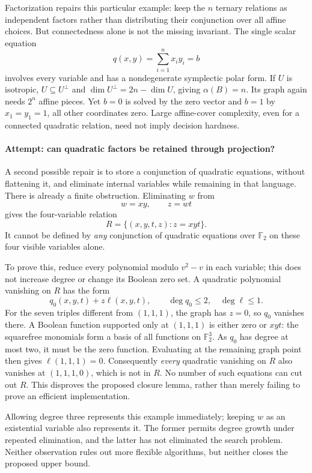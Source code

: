 \documentclass[11pt]{article}
\newcommand{\F}{\mathbb{F}}
\begin{document}
Factorization repairs this particular example: keep the $n$ ternary relations
as independent factors rather than distributing their conjunction over all
affine choices. But connectedness alone is not the missing invariant. The
single scalar equation
\[
                  q(x,y)=\sum_{i=1}^n x_i y_i=b
\]
involves every variable and has a nondegenerate symplectic polar form. If $U$
is isotropic, $U\subseteq U^\perp$ and $\dim U^\perp=2n-\dim U$, giving
$\alpha(B)=n$. Its graph again needs $2^n$ affine pieces. Yet $b=0$ is solved
by the zero vector and $b=1$ by $x_1=y_1=1$, all other coordinates zero.
Large affine-cover complexity, even for a connected quadratic relation, need
not imply decision hardness.

\paragraph{Attempt: can quadratic factors be retained through projection?}
A second possible repair is to store a conjunction of quadratic equations,
without flattening it, and eliminate internal variables while remaining in
that language. There is already a finite obstruction. Eliminating $w$ from
\[
                     w=xy,\qquad z=wt
\]
gives the four-variable relation
\begin{equation}\label{ra:statement:cubic}
                   R=\{(x,y,t,z):z=xyt\}.
\end{equation}
It cannot be defined by \emph{any} conjunction of quadratic equations over
$\F_2$ on these four visible variables alone.

To prove this, reduce every polynomial modulo $v^2-v$ in each variable; this
does not increase degree or change its Boolean zero set. A quadratic
polynomial vanishing on $R$ has the form
\[
 q_0(x,y,t)+z\ell(x,y,t),\qquad \deg q_0\le2,\quad\deg\ell\le1.
\]
For the seven triples different from $(1,1,1)$, the graph has $z=0$, so $q_0$
vanishes there. A Boolean function supported only at $(1,1,1)$ is either zero
or $xyt$: the squarefree monomials form a basis of all functions on
$\F_2^3$. As $q_0$ has degree at most two, it must be the zero function.
Evaluating at the remaining graph point then gives $\ell(1,1,1)=0$.
Consequently \emph{every} quadratic vanishing on $R$ also vanishes at
$(1,1,1,0)$, which is not in $R$. No number of such equations can cut out $R$.
This disproves the proposed closure lemma, rather than merely failing to prove
an efficient implementation.

Allowing degree three represents this example immediately; keeping $w$ as an
existential variable also represents it. The former permits degree growth
under repeated elimination, and the latter has not eliminated the search
problem. Neither observation rules out more flexible algorithms, but neither
closes the proposed upper bound.
\end{document}
